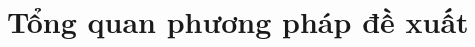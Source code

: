 \documentclass[a4paper, 12pt]{report}
\begin{document}
\section{Tổng quan phương pháp đề xuất}
\par{








}
\end{document}
